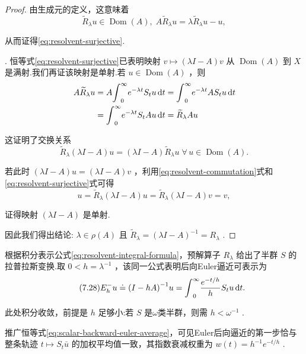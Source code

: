 \begin{proof}
由生成元的定义，这意味着
\[
{\widetilde{R}}_{\lambda }u \in  \operatorname{Dom}\left( A\right) ,\;A{\widetilde{R}}_{\lambda }u = \lambda {\widetilde{R}}_{\lambda }u - u,
\]

从而证得\eqref{eq:resolvent-surjective}.

. 恒等式\eqref{eq:resolvent-surjective}已表明映射 $v \mapsto  \left( {{\lambda I} - A}\right) v$ 从 $\operatorname{Dom}\left( A\right)$ 到 $X$ 是满射.我们再证该映射是单射.若 $u \in  \operatorname{Dom}\left( A\right)$ ，则
{\begin{align*}
A{\widetilde{R}}_{\lambda }u &= A{\int }_{0}^{\infty }{e}^{-{\lambda t}}{S}_{t}{u\mathop{}\!\mathrm{d} t} = {\int }_{0}^{\infty }{e}^{-{\lambda t}}A{S}_{t}{u\mathop{}\!\mathrm{d} t}\\
&= {\int }_{0}^{\infty }{e}^{-{\lambda t}}{S}_{t}{Au\mathop{}\!\mathrm{d} t} = {\widetilde{R}}_{\lambda }{Au}
\end{align*}}

这证明了交换关系
\begin{equation}\tag{7.27}\label{eq:resolvent-commutation}
{\widetilde{R}}_{\lambda }\left( {{\lambda I} - A}\right) u = \left( {{\lambda I} - A}\right) {\widetilde{R}}_{\lambda }u\;\forall\,u \in  \operatorname{Dom}\left( A\right) .
\end{equation}

若此时 $\left( {{\lambda I} - A}\right) u = \left( {{\lambda I} - A}\right) v$ ，利用\eqref{eq:resolvent-commutation}式和\eqref{eq:resolvent-surjective}式可得
\[
u = {\widetilde{R}}_{\lambda }\left( {{\lambda I} - A}\right) u = {\widetilde{R}}_{\lambda }\left( {{\lambda I} - A}\right) v = v,
\]

证得映射 $\left( {{\lambda I} - A}\right)$ 是单射.

因此我们得出结论: $\lambda  \in  \rho \left( A\right)$ 且 ${\widetilde{R}}_{\lambda } = {\left( \lambda I - A\right) }^{-1} = {R}_{\lambda }$ .
\end{proof}

\begin{remark}\label{rem:resolvent-laplace}
根据积分表示公式\eqref{eq:resolvent-integral-formula}，预解算子 ${R}_{\lambda }$ 给出了半群 $S$ 的拉普拉斯变换.取 $0 < h = {\lambda }^{-1}$ ，该同一公式表明后向Euler逼近可表示为
\begin{equation}\tag{7.28}\label{eq:backward-euler-average}
{E}_{h}^{ - }u \doteq  {\left( I - hA\right) }^{-1}u = {\int }_{0}^{\infty }\frac{{e}^{-t/h}}{h}{S}_{t}{u\mathop{}\!\mathrm{d} t}.
\end{equation}

此处积分收敛，前提是 $h$ 足够小:若 $S$ 是$\omega$类半群，则需 $h < {\omega }^{-1}$ .

推广恒等式\eqref{eq:scalar-backward-euler-average}，可见Euler后向逼近的第一步恰与整条轨迹 $t \mapsto  {S}_{t}\bar{u}$ 的加权平均值一致，其指数衰减权重为 $w\left( t\right)  = {h}^{-1}{e}^{-t/h}$ .
\end{remark}


